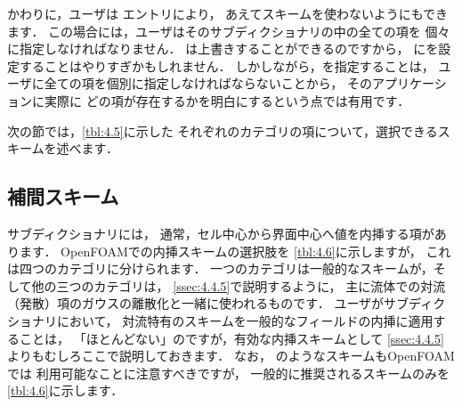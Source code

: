 かわりに，ユーザは
%
%
エントリにより，
あえてスキームを使わないようにもできます．
この場合には，ユーザはそのサブディクショナリの中の全ての項を
個々に指定しなければなりません．
は上書きすることができるのですから，
にを設定することはやりすぎかもしれません．
しかしながら，を指定することは，
ユーザに全ての項を個別に指定しなければならないことから，
そのアプリケーションに実際に
どの項が存在するかを明白にするという点では有用です．

次の節では，\autoref{tbl:4.5}に示した
それぞれのカテゴリの項について，選択できるスキームを述べます．


\subsection{補間スキーム}
\label{ssec:4.4.1}
サブディクショナリには，
通常，セル中心から界面中心へ値を内挿する項があります．
OpenFOAMでの内挿スキームの選択肢を
\autoref{tbl:4.6}に示しますが，
これは四つのカテゴリに分けられます．
一つのカテゴリは一般的なスキームが，そして他の三つのカテゴリは，
\autoref{ssec:4.4.5}で説明するように，
主に流体での対流（発散）項のガウスの離散化と一緒に使われるものです．
ユーザがサブディクショナリにおいて，
対流特有のスキームを一般的なフィールドの内挿に適用することは，
「ほとんどない」のですが，有効な内挿スキームとして
\autoref{ssec:4.4.5}よりもむしろここで説明しておきます．
なお，
%
%
のようなスキームもOpenFOAMでは
利用可能なことに注意すべきですが，
一般的に推奨されるスキームのみを\autoref{tbl:4.6}に示します．

